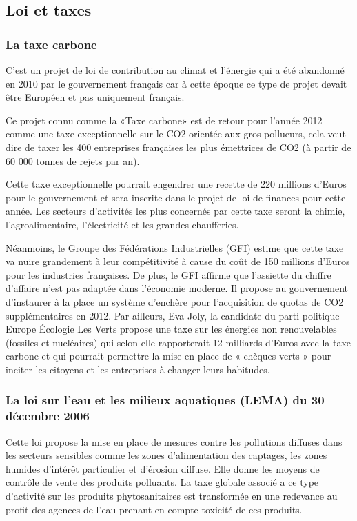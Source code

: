 \documentclass[a4paper,10pt]{article}
\begin{document}
\subsection{Loi et taxes}

\subsubsection{La taxe carbone}

C’est  un projet  de  loi  de contribution  au  climat et  l’énergie  qui a  été
abandonné en  2010 par le  gouvernement français car  à cette époque ce  type de
projet devait être Européen et pas uniquement français. 


Ce projet  connu comme la «Taxe carbone»  est de retour pour  l’année 2012 comme
une taxe exceptionnelle  sur le CO2 orientée aux gros  pollueurs, cela veut dire
de taxer les 400 entreprises françaises  les plus émettrices de CO2 (à partir de
60 000 tonnes de rejets par an). 


Cette taxe exceptionnelle pourrait engendrer une recette de 220 millions d’Euros
pour le  gouvernement et sera  inscrite dans le  projet de loi de  finances pour
cette année. Les  secteurs d’activités les plus concernés  par cette taxe seront
la chimie, l’agroalimentaire, l’électricité et les grandes chaufferies. 


Néanmoins, le Groupe des Fédérations Industrielles (GFI) estime que cette taxe va nuire grandement à leur compétitivité à cause du coût de 150 millions d’Euros pour les industries françaises. De plus, le GFI affirme que l’assiette du chiffre d’affaire n’est pas adaptée dans l’économie moderne. Il propose au gouvernement d’instaurer à la place un système d’enchère pour l’acquisition de quotas de CO2 supplémentaires en 2012.
Par  ailleurs, Eva Joly,  la candidate  du parti  politique Europe  Écologie Les
Verts  propose  une  taxe  sur  les  énergies  non  renouvelables  (fossiles  et
nucléaires)  qui selon  elle  rapporterait  12 milliards  d’Euros  avec la  taxe
carbone et  qui pourrait permettre la  mise en place  de « chèques verts  » pour
inciter les citoyens et les entreprises à changer leurs habitudes.


\subsubsection[La loi sur l’eau et les milieux aquatiques (LEMA)]{La loi sur l’eau et les milieux aquatiques (LEMA) du 30 décembre 2006}

Cette loi propose la mise en place de mesures contre les pollutions diffuses dans les secteurs sensibles comme les zones d’alimentation des captages, les zones humides d’intérêt particulier et d’érosion diffuse.
Elle donne les moyens de contrôle de vente des produits polluants. La taxe globale associé a ce type d’activité sur les produits phytosanitaires est transformée en une redevance au profit des agences de l’eau prenant en compte toxicité de ces produits.
\end{document}
